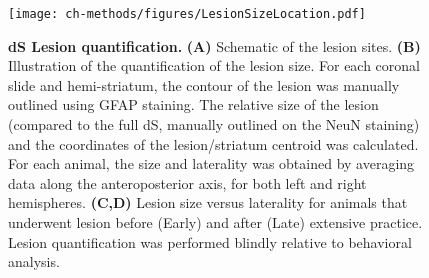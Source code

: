 \begin{figure}[bth!]
 \begin{center}
	\texttt{[image: ch-methods/figures/LesionSizeLocation.pdf]}
	\caption[Lesion Quantification]
	{\textbf{dS Lesion quantification.}
	\textbf{(A)} Schematic of the lesion sites.
	\textbf{(B)} Illustration of the quantification of the lesion size. For each coronal slide and hemi-striatum, the contour of the lesion was manually outlined using GFAP staining.
	The relative size of the lesion (compared to the full dS, manually outlined on the NeuN staining) and the coordinates of the lesion/striatum centroid was calculated.
	For each animal, the size and laterality was obtained by averaging data along the anteroposterior axis, for both left and right hemispheres.
	\textbf{(C,D)} Lesion size versus laterality for animals that underwent lesion before (Early) and after (Late) extensive practice.
	Lesion quantification was performed blindly relative to behavioral analysis.
	}
	\label{fig:method:LesionSizeLocation}
 \end{center}
\end{figure}